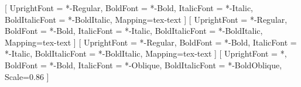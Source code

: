 
\usepackage{geometry}
\geometry{a4paper, top=2.4cm, bottom=2.6cm, left=2.3cm, right=2.3cm, headheight=26pt, headsep=12pt, footskip=32pt}

\usepackage{fontspec}
\usepackage{polyglossia}
\setmainlanguage{english}
\setmainfont{LiberationSerif}[
  UprightFont = *-Regular, BoldFont = *-Bold,
  ItalicFont = *-Italic, BoldItalicFont = *-BoldItalic,
  Mapping=tex-text
]
\newfontfamily{}[
  UprightFont = *-Regular, BoldFont = *-Bold,
  ItalicFont = *-Italic, BoldItalicFont = *-BoldItalic, Mapping=tex-text
]
\newfontfamily{}[
  UprightFont = *-Regular, BoldFont = *-Bold,
  ItalicFont = *-Italic, BoldItalicFont = *-BoldItalic, Mapping=tex-text
]
\setmonofont{DejaVuSansMono}[
  UprightFont = *, BoldFont = *-Bold,
  ItalicFont = *-Oblique, BoldItalicFont = *-BoldOblique,
  Scale=0.86
]

\let\malorigunderscore\_
\renewcommand{\_}{\malorigunderscore\allowbreak}

